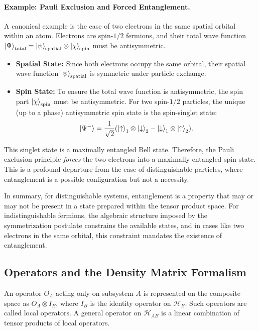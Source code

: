 \paragraph{Example: Pauli Exclusion and Forced Entanglement.}
A canonical example is the case of two electrons in the same spatial orbital
within an atom. Electrons are spin-$1/2$ fermions, and their total wave
function $\ket{\Psi}_{\text{total}} = \ket{\psi}_{\text{spatial}} \otimes
\ket{\chi}_{\text{spin}}$ must be antisymmetric.
\begin{itemize}
	\item \textbf{Spatial State:} Since both electrons occupy the same
		orbital, their spatial wave function $\ket{\psi}_{\text{spatial}}$
		is symmetric under particle exchange.
	\item \textbf{Spin State:} To ensure the total wave function is
		antisymmetric, the spin part $\ket{\chi}_{\text{spin}}$ must be
		antisymmetric. For two spin-$1/2$ particles, the unique (up to a
		phase) antisymmetric spin state is the spin-singlet state:
		\begin{equation}
			\ket{\Psi^-} = \frac{1}{\sqrt{2}} (\ket{\uparrow}_1 \otimes
			\ket{\downarrow}_2 - \ket{\downarrow}_1 \otimes \ket{\uparrow}_2).
		\end{equation}
\end{itemize}
This singlet state is a maximally entangled Bell state. Therefore, the Pauli
exclusion principle \textit{forces} the two electrons into a maximally
entangled spin state. This is a profound departure from the case of
distinguishable particles, where entanglement is a possible configuration but
not a necessity.

In summary, for distinguishable systems, entanglement is a property that may
or may not be present in a state prepared within the tensor product space.
For indistinguishable fermions, the algebraic structure imposed by the
symmetrization postulate constrains the available states, and in cases like
two electrons in the same orbital, this constraint mandates the existence of
entanglement.

\subsection{Operators and the Density Matrix Formalism}
\label{sub:operators_density}

An operator $O_A$ acting only on subsystem $A$ is represented on the
composite space as $O_A \otimes I_B$, where $I_B$ is the
identity operator on $\mathcal{H}_B$. Such operators are called
local operators. A general operator on $\mathcal{H}_{AB}$ is a
linear combination of tensor products of local operators.

